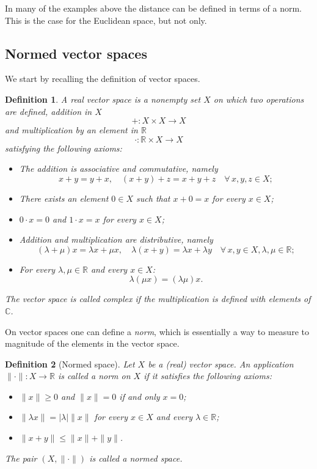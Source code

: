\documentclass[a4paper,reqno]{amsart}
\numberwithin{equation}{section}
\newtheorem{definition}{Definition}[section]
\def\C{\mathbb{C}}
\def\R{\mathbb{R}}
\begin{document}
In many of the examples above the distance can be defined in terms of a norm. This is the case for the Euclidean space, but not only.

\subsection{Normed vector spaces}

We start by recalling the definition of vector spaces.

\begin{definition}
A real vector space is a nonempty set $X$ on which two operations are defined, addition in $X$
$$
+ : X\times X \to X
$$
and multiplication by an element in $\R$
$$
\cdot : \R\times X \to X
$$
satisfying the following axioms:
\begin{itemize}
\item The addition is associative and commutative, namely
$$
x+y = y+x, \quad (x+y)+z = x+y+z \quad \forall \, x,y,z \in X;
$$
\item There exists an element $0\in X$ such that $x+0=x$ for every $x\in X$;
\item $0\cdot x = 0$ and $1\cdot x= x$ for every $x\in X$;
\item Addition and multiplication are distributive, namely
$$
(\lambda+\mu)x = \lambda x+ \mu x, \quad \lambda(x+y) = \lambda x+ \lambda y \quad \forall \, x,y \in X, \lambda,\mu\in \R;
$$
\item For every $\lambda, \mu \in \R$ and every $x\in X$:
$$
\lambda(\mu x) = (\lambda \mu) x.
$$
\end{itemize}

The vector space is called complex if the multiplication is defined with elements of $\C$.
\end{definition}


On vector spaces one can define a \textit{norm}, which is essentially a way to measure to magnitude of the elements in the vector space.


\begin{definition}[Normed space]
Let $X$ be a (real) vector space. An application $\|\cdot\|: X\to \R$ is called a norm on $X$ if it satisfies the following axioms:
\begin{itemize}
\item[(N1)] $\|x\|\geq0$ and $\|x\|=0$ if and only $x=0$;
\item[(N2)] $\|\lambda x\| = |\lambda| \|x\|$ for every $x\in X$ and every $\lambda\in \R$;
\item[(N3)] $\|x+y\|\leq \|x\| + \|y\|$.
\end{itemize}
The pair $(X,\|\cdot\|)$ is called a normed space.
\end{definition}
\end{document}

